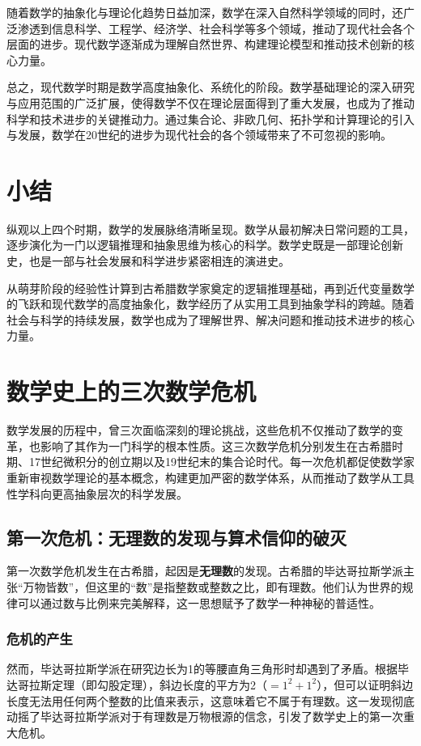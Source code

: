 随着数学的抽象化与理论化趋势日益加深，数学在深入自然科学领域的同时，还广泛渗透到信息科学、工程学、经济学、社会科学等多个领域，推动了现代社会各个层面的进步。现代数学逐渐成为理解自然世界、构建理论模型和推动技术创新的核心力量。

总之，现代数学时期是数学高度抽象化、系统化的阶段。数学基础理论的深入研究与应用范围的广泛扩展，使得数学不仅在理论层面得到了重大发展，也成为了推动科学和技术进步的关键推动力。通过集合论、非欧几何、拓扑学和计算理论的引入与发展，数学在20世纪的进步为现代社会的各个领域带来了不可忽视的影响。
\section{小结}
纵观以上四个时期，数学的发展脉络清晰呈现。数学从最初解决日常问题的工具，逐步演化为一门以逻辑推理和抽象思维为核心的科学。数学史既是一部理论创新史，也是一部与社会发展和科学进步紧密相连的演进史。

从萌芽阶段的经验性计算到古希腊数学家奠定的逻辑推理基础，再到近代变量数学的飞跃和现代数学的高度抽象化，数学经历了从实用工具到抽象学科的跨越。随着社会与科学的持续发展，数学也成为了理解世界、解决问题和推动技术进步的核心力量。

\section{ 数学史上的三次数学危机}

数学发展的历程中，曾三次面临深刻的理论挑战，这些危机不仅推动了数学的变革，也影响了其作为一门科学的根本性质。这三次数学危机分别发生在古希腊时期、17世纪微积分的创立期以及19世纪末的集合论时代。每一次危机都促使数学家重新审视数学理论的基本概念，构建更加严密的数学体系，从而推动了数学从工具性学科向更高抽象层次的科学发展。

\subsection{第一次危机：无理数的发现与算术信仰的破灭}

第一次数学危机发生在古希腊，起因是{\bf 无理数}的发现。古希腊的毕达哥拉斯学派主张“万物皆数”，但这里的“数”是指整数或整数之比，即有理数。他们认为世界的规律可以通过数与比例来完美解释，这一思想赋予了数学一种神秘的普适性。
\subsubsection{危机的产生}
然而，毕达哥拉斯学派在研究边长为1的等腰直角三角形时却遇到了矛盾。根据毕达哥拉斯定理（即勾股定理），斜边长度的平方为2（$=1^2+1^2$），但可以证明斜边长度无法用任何两个整数的比值来表示，这意味着它不属于有理数。这一发现彻底动摇了毕达哥拉斯学派对于有理数是万物根源的信念，引发了数学史上的第一次重大危机。

